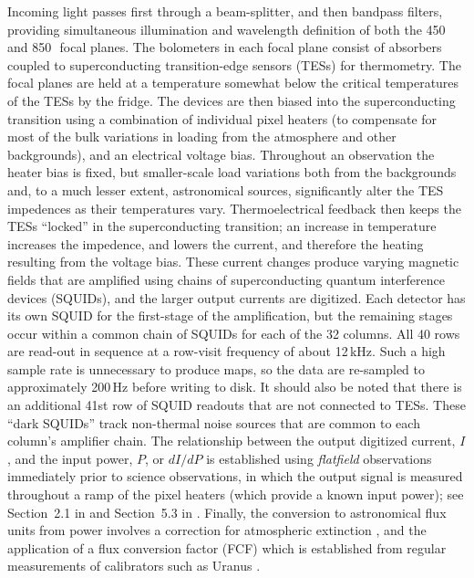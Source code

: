 \documentclass[useAMS,usenatbib,nofootinbib]{mn2e}
\begin{document}
Incoming light passes first through a beam-splitter, and then bandpass
filters, providing simultaneous illumination and wavelength definition
of both the 450 and 850\,\micron\ focal planes. The bolometers in each
focal plane consist of absorbers coupled to superconducting
transition-edge sensors (TESs) for thermometry. The focal planes are
held at a temperature somewhat below the critical temperatures of the
TESs by the fridge. The devices are then biased into the
superconducting transition using a combination of individual pixel
heaters (to compensate for most of the bulk variations in loading from
the atmosphere and other backgrounds), and an electrical voltage
bias. Throughout an observation the heater bias is fixed, but
smaller-scale load variations both from the backgrounds and, to a much
lesser extent, astronomical sources, significantly alter the TES
impedences as their temperatures vary. Thermoelectrical feedback then
keeps the TESs ``locked'' in the superconducting transition; an
increase in temperature increases the impedence, and lowers the
current, and therefore the heating resulting from the voltage
bias. These current changes produce varying magnetic fields that are
amplified using chains of superconducting quantum interference devices
(SQUIDs), and the larger output currents are digitized. Each detector
has its own SQUID for the first-stage of the amplification, but the
remaining stages occur within a common chain of SQUIDs for each of the
32 columns. All 40 rows are read-out in sequence at a row-visit
frequency of about 12\,kHz. Such a high sample rate is unnecessary to
produce maps, so the data are re-sampled to approximately 200\,Hz
before writing to disk.  It should also be noted that there is an
additional 41st row of SQUID readouts that are not connected to
TESs. These ``dark SQUIDs'' track non-thermal noise sources that are
common to each column's amplifier chain. The relationship between the
output digitized current, $I$, and the input power, $P$, or $dI/dP$ is
established using \emph{flatfield} observations immediately prior to
science observations, in which the output signal is measured
throughout a ramp of the pixel heaters (which provide a known input
power); see Section~2.1 in \citet{dempsey2012} and Section~5.3 in
\citet{holland2012}. Finally, the conversion to astronomical flux
units from power involves a correction for atmospheric extinction
\citep[primarily using the JCMT Water Vapour Monitor to track
line-of-sight opacity variations, see Section~3 in][]{dempsey2012},
and the application of a flux conversion factor (FCF) which is
established from regular measurements of calibrators such as Uranus
\citep[Section~5 in][]{dempsey2012}.
\end{document}
